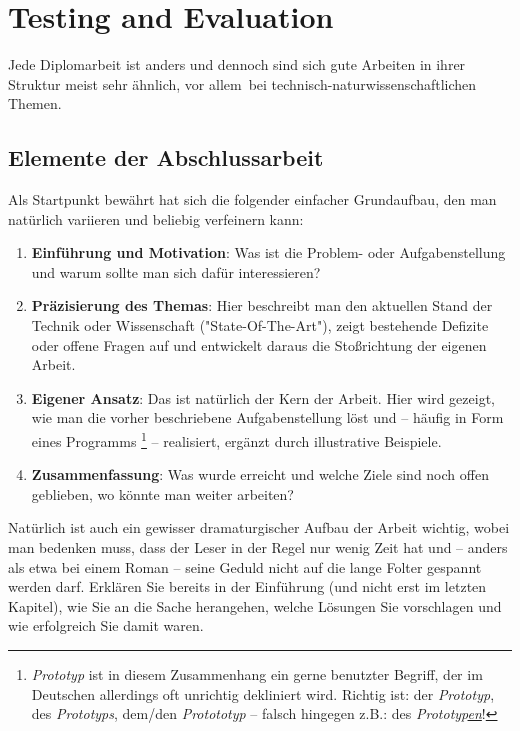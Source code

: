 \chapter{Testing and Evaluation}
\label{cha:Diplomschrift}

Jede Diplomarbeit ist anders und dennoch sind sich gute
Arbeiten in ihrer Struktur meist sehr ähnlich, vor allem\ bei
technisch-natur\-wissen\-schaft\-lichen Themen. 

\section{Elemente der Abschlussarbeit}

Als Startpunkt bewährt hat sich die folgender
einfacher Grundaufbau, den man natürlich vari\-ieren und beliebig
verfeinern kann:
%
\begin{enumerate}
\item \textbf{Einführung und Motivation}: Was ist die Problem- oder Aufgabenstellung und
warum sollte man sich dafür interessieren?
\item \textbf{Präzisierung des Themas}: Hier beschreibt man den aktuellen Stand der Technik
oder Wissenschaft ("State-Of-The-Art"), zeigt bestehende
Defizite oder offene Fragen auf und entwickelt daraus die
Stoßrichtung der eigenen Arbeit.
\item \textbf{Eigener Ansatz}: Das ist natürlich der Kern der Arbeit. Hier
wird gezeigt, wie man die vorher beschriebene Aufgabenstellung löst und --
häufig in Form eines Programms%
\footnote{\emph{Prototyp} ist in diesem Zusammenhang ein gerne benutzter Begriff, der im Deutschen
allerdings oft unrichtig dekliniert wird. Richtig ist: der \emph{Prototyp}, des \emph{Prototyps}, dem/den \emph{Protototyp} -- falsch hingegen z.B.: des \emph{Prototyp\underline{en}}!
} --
realisiert, ergänzt durch illustrative Beispiele.
\item \textbf{Zusammenfassung}: Was wurde erreicht und welche Ziele sind
noch offen geblieben, wo könnte man weiter arbeiten?
\end{enumerate}
%
Natürlich ist auch ein gewisser dramaturgischer Aufbau der Arbeit
wichtig, wobei man bedenken muss, dass der Leser in der Regel nur
wenig Zeit hat und -- anders als etwa bei einem Roman -- seine
Geduld nicht auf die lange Folter gespannt werden darf. Erklären
Sie bereits in der Einführung (und nicht erst im letzten Kapitel),
wie Sie an die Sache herangehen, welche Lösungen Sie vorschlagen
und wie erfolgreich Sie damit waren.

